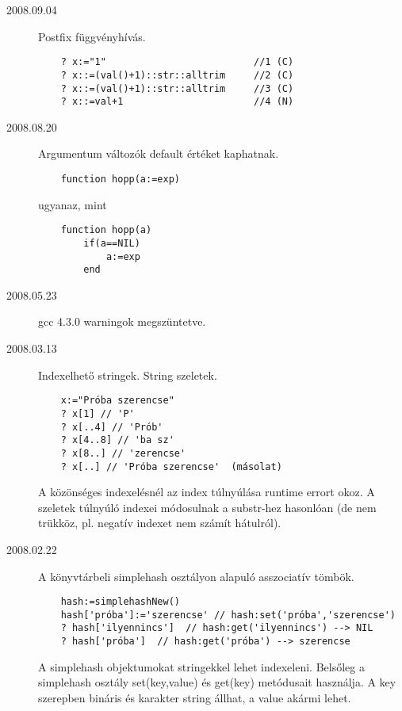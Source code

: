 \begin{description}
\item[2008.09.04]
   Postfix függvényhívás.
\begin{verbatim}
    ? x:="1"                          //1 (C)
    ? x::=(val()+1)::str::alltrim     //2 (C)
    ? x::=(val()+1)::str::alltrim     //3 (C)
    ? x::=val+1                       //4 (N)
\end{verbatim}

\item[2008.08.20]
  Argumentum változók default értéket kaphatnak.

\begin{verbatim}
    function hopp(a:=exp)
\end{verbatim}

  ugyanaz, mint  
  
\begin{verbatim}
    function hopp(a)
        if(a==NIL)
            a:=exp
        end
\end{verbatim}


\item[2008.05.23]
  gcc 4.3.0 warningok megszüntetve.\par

\label{20080313}
\item[2008.03.13]
  Indexelhető stringek. String szeletek.
\begin{verbatim}
    x:="Próba szerencse"
    ? x[1] // 'P'
    ? x[..4] // 'Prób'
    ? x[4..8] // 'ba sz'
    ? x[8..] // 'zerencse'
    ? x[..] // 'Próba szerencse'  (másolat)
\end{verbatim}
  A közönséges indexelésnél az index túlnyúlása runtime errort okoz. 
  A szeletek túlnyúló indexei módosulnak a substr-hez hasonlóan
  (de nem trükköz, pl. negatív indexet nem számít hátulról).\par
   

\label{20080222}
\item[2008.02.22]
  A könyvtárbeli simplehash osztályon alapuló asszociatív tömbök.
\begin{verbatim}
    hash:=simplehashNew()
    hash['próba']:='szerencse' // hash:set('próba','szerencse')
    ? hash['ilyennincs']  // hash:get('ilyennincs') --> NIL
    ? hash['próba']  // hash:get('próba') --> szerencse
\end{verbatim}
  A simplehash objektumokat stringekkel lehet indexeleni.
  Belsőleg a simplehash osztály set(key,value) és get(key) metódusait
  használja.  A key szerepben bináris és karakter string állhat, 
  a value akármi lehet. \par


\end{description}

